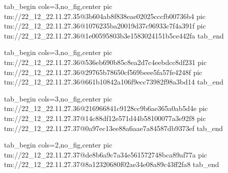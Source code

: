  
 
 
 
 

\qqSecCmtScr


\ifcmt
  tab_begin cols=3,no_fig,center
    pic tm://22_12_22.11.27.35@3b604ab8f838eae02025cccfb00736b4
    pic tm://22_12_22.11.27.36@1076235ba20019d37c96933c7f4a391f
    pic tm://22_12_22.11.27.36@1e00595803b3e1583024151b5ce442fa
  tab_end
\fi


\ifcmt
  tab_begin cols=3,no_fig,center
    pic tm://22_12_22.11.27.36@536eb690b85c8ea2d7c4eebdcc8df231
    pic tm://22_12_22.11.27.36@29765b78650cf569beee5fa57fe4248f
    pic tm://22_12_22.11.27.36@661b10842a106f9ecc73982f98a3bd14
  tab_end
\fi


\ifcmt
  tab_begin cols=3,no_fig,center
    pic tm://22_12_22.11.27.36@216966841c9128cc9b6ae365a0ab5d4e
    pic tm://22_12_22.11.27.37@14c88df12e571d44b58100077a3e92f8
    pic tm://22_12_22.11.27.37@0a97ec13ee88a6aae7a84587db9373ef
  tab_end
\fi


\ifcmt
  tab_begin cols=2,no_fig,center
    pic tm://22_12_22.11.27.37@de8b6a9c7a34e561572748bca89af77a
    pic tm://22_12_22.11.27.37@8a12320680f02ae34e08a89c43ff2fa8
  tab_end
\fi

